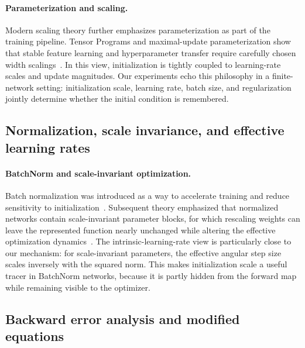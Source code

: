 \documentclass{article}
\begin{document}
\paragraph{Parameterization and scaling.}
Modern scaling theory further emphasizes parameterization as part of the training pipeline.  Tensor Programs and maximal-update parameterization show that stable feature learning and hyperparameter transfer require carefully chosen width scalings~\citep{yang2020tensor,yang2021feature,yang2021tensorv}.  In this view, initialization is tightly coupled to learning-rate scales and update magnitudes.  Our experiments echo this philosophy in a finite-network setting: initialization scale, learning rate, batch size, and regularization jointly determine whether the initial condition is remembered.

\subsection{Normalization, scale invariance, and effective learning rates}
\label{app:scale-invariance}

\paragraph{BatchNorm and scale-invariant optimization.}
Batch normalization was introduced as a way to accelerate training and reduce sensitivity to initialization~\citep{ioffe2015batch}.  Subsequent theory emphasized that normalized networks contain scale-invariant parameter blocks, for which rescaling weights can leave the represented function nearly unchanged while altering the effective optimization dynamics~\citep{arora2019auto,li2020intrinsic}.  The intrinsic-learning-rate view is particularly close to our mechanism: for scale-invariant parameters, the effective angular step size scales inversely with the squared norm.  This makes initialization scale a useful tracer in BatchNorm networks, because it is partly hidden from the forward map while remaining visible to the optimizer.


\subsection{Backward error analysis and modified equations}
\label{app:bea-modified-equations}
\end{document}
